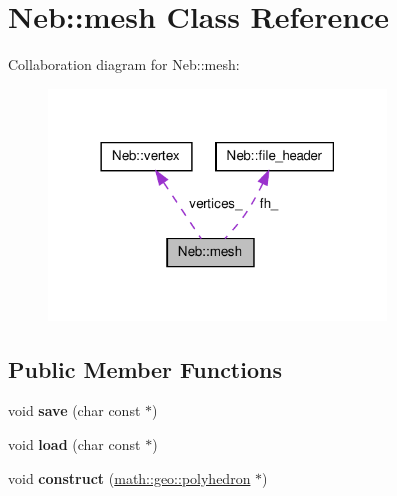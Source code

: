 \hypertarget{classNeb_1_1mesh}{\section{\-Neb\-:\-:mesh \-Class \-Reference}
\label{classNeb_1_1mesh}
}


\-Collaboration diagram for \-Neb\-:\-:mesh\-:\nopagebreak
\begin{figure}[H]
\begin{center}
\leavevmode
\includegraphics[width=254pt]{classNeb_1_1mesh__coll__graph}
\end{center}
\end{figure}
\subsection*{\-Public \-Member \-Functions}
\begin{DoxyCompactItemize}
\item 
\hypertarget{classNeb_1_1mesh_a1cd62a13078f9ee11a30741bdfc97192}{void {\bfseries save} (char const $\ast$)}\label{classNeb_1_1mesh_a1cd62a13078f9ee11a30741bdfc97192}

\item 
\hypertarget{classNeb_1_1mesh_aa0ead851d8c982cdf7c05366a8c3600f}{void {\bfseries load} (char const $\ast$)}\label{classNeb_1_1mesh_aa0ead851d8c982cdf7c05366a8c3600f}

\item 
\hypertarget{classNeb_1_1mesh_a9b05b1c31bc11297c4cbc85800fef4e0}{void {\bfseries construct} (\hyperlink{classmath_1_1geo_1_1polyhedron}{math\-::geo\-::polyhedron} $\ast$)}\label{classNeb_1_1mesh_a9b05b1c31bc11297c4cbc85800fef4e0}

\end{DoxyCompactItemize}
